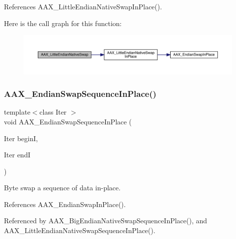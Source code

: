 References A\+A\+X\+\_\+\+Little\+Endian\+Native\+Swap\+In\+Place().

Here is the call graph for this function\+:
\nopagebreak
\begin{figure}[H]
\begin{center}
\leavevmode
\includegraphics[width=350pt]{a00488_a49f57c502ff278b26260b1744da99633_cgraph}
\end{center}
\end{figure}
\mbox{\label{a00488_ae58f8ce3c8247e07d49e17c011ec5366}} 
\subsubsection{\texorpdfstring{AAX\_EndianSwapSequenceInPlace()}{AAX\_EndianSwapSequenceInPlace()}}
{\footnotesize\ttfamily template$<$class Iter $>$ \\
void A\+A\+X\+\_\+\+Endian\+Swap\+Sequence\+In\+Place (\begin{DoxyParamCaption}\item[{Iter}]{beginI,  }\item[{Iter}]{endI }\end{DoxyParamCaption})\hspace{0.3cm}{\ttfamily [inline]}}



Byte swap a sequence of data in-\/place. 



References A\+A\+X\+\_\+\+Endian\+Swap\+In\+Place().



Referenced by A\+A\+X\+\_\+\+Big\+Endian\+Native\+Swap\+Sequence\+In\+Place(), and A\+A\+X\+\_\+\+Little\+Endian\+Native\+Swap\+Sequence\+In\+Place().

